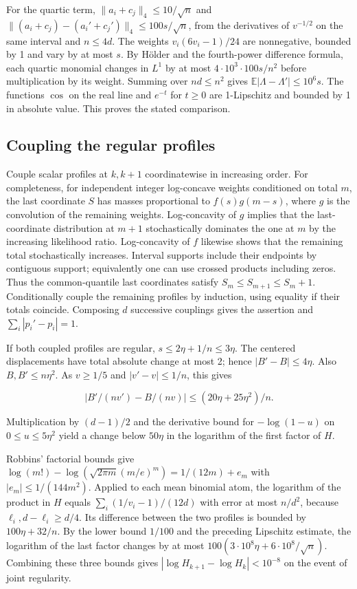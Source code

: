 \documentclass[11pt]{article}
\begin{document}
For the quartic term, $\|a_i+c_j\|_4\le10/\sqrt n$ and $\|(a_i+c_j)-(a_i'+c_j')\|_4\le100s/\sqrt n$, from the derivatives of $v^{-1/2}$ on the same interval and $n\le4d$. The weights $v_i(6v_i-1)/24$ are nonnegative, bounded by 1 and vary by at most $s$. By Hölder and the fourth-power difference formula, each quartic monomial changes in $L^1$ by at most $4\cdot10^3\cdot100s/n^2$ before multiplication by its weight. Summing over $nd\le n^2$ gives $\mathbb E|\Lambda-\Lambda'|\le 10^6s$. The functions $\cos$ on the real line and $e^{-t}$ for $t\ge0$ are 1-Lipschitz and bounded by 1 in absolute value. This proves the stated comparison.

\subsection{Coupling the regular profiles}

Couple scalar profiles at $k,k+1$ coordinatewise in increasing order. For completeness, for independent integer log-concave weights conditioned on total $m$, the last coordinate $S$ has masses proportional to $f(s)g(m-s)$, where $g$ is the convolution of the remaining weights. Log-concavity of $g$ implies that the last-coordinate distribution at $m+1$ stochastically dominates the one at $m$ by the increasing likelihood ratio. Log-concavity of $f$ likewise shows that the remaining total stochastically increases. Interval supports include their endpoints by contiguous support; equivalently one can use crossed products including zeros. Thus the common-quantile last coordinates satisfy $S_m\le S_{m+1}\le S_m+1$. Conditionally couple the remaining profiles by induction, using equality if their totals coincide. Composing $d$ successive couplings gives the assertion and $\sum_i|p_i'-p_i|=1$.

If both coupled profiles are regular, $s\le2\eta+1/n\le3\eta$. The centered displacements have total absolute change at most 2; hence $|B'-B|\le4\eta$. Also $B,B'\le n\eta^2$. As $v\ge1/5$ and $|v'-v|\le1/n$, this gives

\[
|B'/(nv')-B/(nv)|\le(20\eta+25\eta^2)/n .
\]

Multiplication by $(d-1)/2$ and the derivative bound for $-\log(1-u)$ on $0\le u\le 5\eta^2$ yield a change below $50\eta$ in the logarithm of the first factor of $H$.

Robbins' factorial bounds give $\log(m!)-\log(\sqrt{2\pi m}(m/e)^m)=1/(12m)+e_m$ with $|e_m|\le1/(144m^2)$. Applied to each mean binomial atom, the logarithm of the product in $H$ equals $\sum_i(1/v_i-1)/(12d)$ with error at most $n/d^2$, because $\ell_i,d-\ell_i\ge d/4$. Its difference between the two profiles is bounded by $100\eta+32/n$. By the lower bound $1/100$ and the preceding Lipschitz estimate, the logarithm of the last factor changes by at most $100(3\cdot10^8\eta+6\cdot10^8/\sqrt n)$. Combining these three bounds gives $|\log H_{k+1}-\log H_k|<10^{-8}$ on the event of joint regularity.
\end{document}
